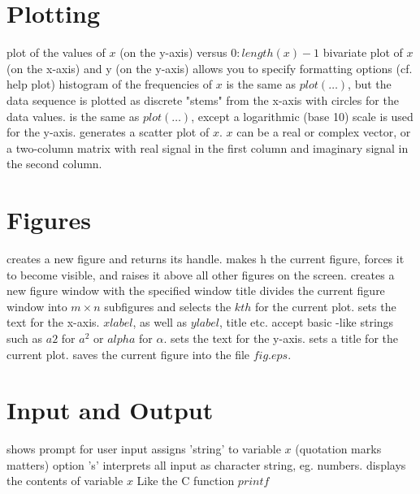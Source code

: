 \section{Plotting}{}
	{plot of the values of $x$ (on the y-axis) versus $0:length(x)-1$}
	{bivariate plot of $x$ (on the x-axis) and y (on the y-axis)}
	{allows you to specify formatting options (cf. help plot)}
	{histogram of the frequencies of $x$}
	{is the same as $plot(\ldots)$, but the data sequence is plotted as discrete "stems" from the x-axis with circles for the data values.}
	{is the same as $plot(\ldots)$, except a logarithmic (base 10) scale is used for the y-axis.}
	{generates a scatter plot of $x$. $x$ can be a real or complex vector, or a two-column matrix with real signal in the first column and imaginary signal in the second column.}

\section{Figures}{}
	{creates a new figure and returns its handle.}
	{makes h the current figure, forces it to become visible, and raises it above all other figures on the screen.}
	{creates a new figure window with the specified window title}
	{divides the current figure window into $m \times n$ subfigures and selects the $kth$ for the current plot.}
	{sets the text for the x-axis. $xlabel$, as well as
$ylabel$, title etc. accept basic \ltx-like strings such as $a$\expon $2$ for
$a^2$ or \bs $alpha$ for $\alpha$.}
	{sets the text for the y-axis.}
	{sets a title for the current plot.}
	{saves the current figure into the file $fig.eps$.}

\section{Input and Output}{}
	{shows prompt for user input}
	{assigns 'string' to variable $x$ (quotation marks matters)}
	{option 's' interprets all input as character string, eg. numbers.}
	{displays the contents of variable $x$}
	{Like the C function $printf$}

